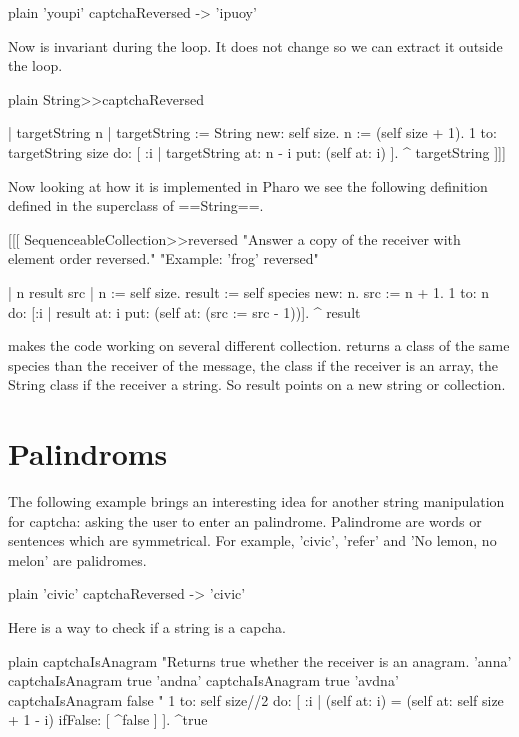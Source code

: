 \documentclass[10pt,twoside,english]{_support/latex/sbabook/sbabook}
\begin{document}
\begin{displaycode}{plain}
'youpi' captchaReversed
-> 'ipuoy'
\end{displaycode}

 Now  is invariant during the loop. It does not change so we can extract it outside the loop.

\begin{displaycode}{plain}
String>>captchaReversed

	| targetString n |
	targetString := String new: self size.
	n := (self size + 1).
	1 to: targetString size do: [ :i | 
		targetString at: n - i put: (self at: i)
		].
	^ targetString
	]]]

Now looking at how it is implemented in Pharo we see the following definition defined in the superclass of ==String==.


[[[
SequenceableCollection>>reversed
	"Answer a copy of the receiver with element order reversed."
	"Example: 'frog' reversed"

	| n result src |
	n := self size.
	result := self species new: n.
	src := n + 1.
	1 to: n do: [:i | result at: i put: (self at: (src := src - 1))].
	^ result
\end{displaycode}

	 makes the code working on several different collection.  returns a class of the same species than the receiver of the message, the class  if the receiver is an array, the String class if the receiver a string. So result points on a new string or collection.
\chapter{Palindroms}
The following example brings an interesting idea for another string manipulation for captcha: asking the user to enter an palindrome. Palindrome are words or sentences which are symmetrical. For example, 'civic', 'refer' and  'No lemon, no melon' are palidromes.

\begin{displaycode}{plain}
'civic' captchaReversed 
-> 
'civic'
\end{displaycode}

Here is a way to check if a string is a capcha.

\begin{displaycode}{plain}
captchaIsAnagram
	"Returns true whether the receiver is an anagram.
	'anna' captchaIsAnagram
		true
	'andna' captchaIsAnagram 
		true
	'avdna' captchaIsAnagram 
		false
	"
	1 
		to: self size//2 
		do: [ :i | (self at: i) = (self at: self size + 1 - i)
						ifFalse: [ ^false ]
				].
	^true
\end{displaycode}
\end{document}
